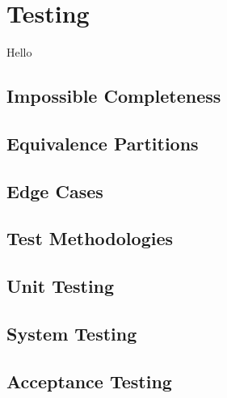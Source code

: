 \chapter{Testing}

Hello

\section{Impossible Completeness}

\section{Equivalence Partitions}

\section{Edge Cases}

\section{Test Methodologies}

\section{Unit Testing}
\csharpsubsection{\csharp}

\section{System Testing}

\section{Acceptance Testing}

